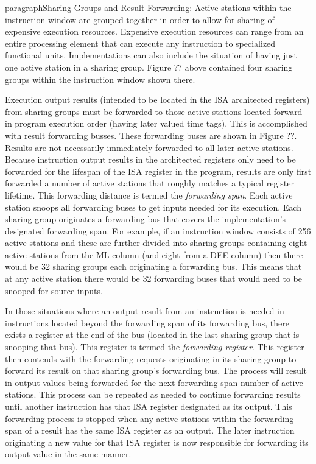 
paragraph{Sharing Groups and Result Forwarding: }
Active stations within the instruction window are grouped together in
order to allow for sharing of expensive execution resources.  Expensive
execution resources can range from an entire processing element that
can execute any instruction to specialized functional units.
Implementations can also include the situation of having just one
active station in a sharing group.  Figure ?? above contained four
sharing groups within the instruction window shown there.

Execution output results (intended to be located in the ISA architected
registers) from sharing groups must be forwarded to those active
stations located forward in program execution order (having later
valued time tags).  This is accomplished with result forwarding
busses.  These forwarding buses are shown in Figure ??.  Results are
not necessarily immediately forwarded to all later active stations.
Because instruction output results in the architected registers only
need to be forwarded for the lifespan of the ISA register in the
program, results are only first forwarded a number of active stations
that roughly matches a typical register lifetime.  This forwarding
distance is termed the {\it forwarding span}.  Each active station
snoops all forwarding buses to get inputs needed for its execution.
Each sharing group originates a forwarding bus that covers the
implementation's designated forwarding span.  For example, if an
instruction window consists of 256 active stations and these are
further divided into sharing groups containing eight active stations
from the ML column (and eight from a DEE column) then there would be 32
sharing groups each originating a forwarding bus.  This means that at
any active station there would be 32 forwarding buses that would need
to be snooped for source inputs.

In those situations where an output result from an instruction is
needed in instructions located beyond the forwarding span of its
forwarding bus, there exists a register at the end of the bus (located
in the last sharing group that is snooping that bus).  This register is
termed the {\it forwarding register}.  This register then contends
with the forwarding requests originating in its sharing group to
forward its result on that sharing group's forwarding bus.  The process
will result in output values being forwarded for the next forwarding
span number of active stations.  This process can be repeated as needed
to continue forwarding results until another instruction has that ISA
register designated as its output.  This forwarding process is stopped
when any active stations within the forwarding span of a result has the
same ISA register as an output.  The later instruction originating a
new value for that ISA register is now responsible for forwarding its
output value in the same manner.

